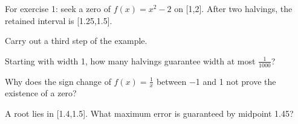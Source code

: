 \documentclass[11pt]{article}
\begin{document}
For exercise 1: seek a zero of \(f(x)=x^{2}-2\) on [1,2]. After two halvings, the retained interval is [1.25,1.5].\par
\vspace{5pt}
Carry out a third step of the example.\par
\vspace{5pt}
Starting with width 1, how many halvings guarantee width at most \(\frac{1}{1000}\)?\par
\vspace{5pt}
Why does the sign change of \(f(x)=\frac{1}{x}\) between −1 and 1 not prove the existence of a zero?\par
\vspace{5pt}
A root lies in [1.4,1.5]. What maximum error is guaranteed by midpoint 1.45?\par
\vspace{5pt}
\end{document}
